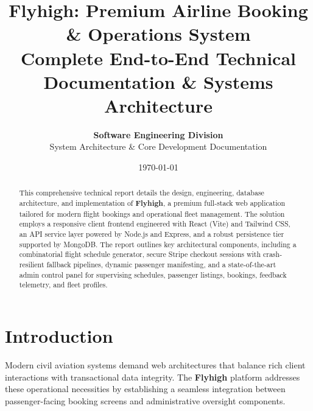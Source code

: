\documentclass[12pt,a4paper]{article}
\title{\textbf{Flyhigh: Premium Airline Booking \& Operations System} \\ \large Complete End-to-End Technical Documentation \& Systems Architecture}
\author{\textbf{Software Engineering Division} \\ System Architecture \& Core Development Documentation}
\date{\today}
\begin{document}
\maketitle

\begin{abstract}
This comprehensive technical report details the design, engineering, database architecture, and implementation of \textbf{Flyhigh}, a premium full-stack web application tailored for modern flight bookings and operational fleet management. The solution employs a responsive client frontend engineered with React (Vite) and Tailwind CSS, an API service layer powered by Node.js and Express, and a robust persistence tier supported by MongoDB. The report outlines key architectural components, including a combinatorial flight schedule generator, secure Stripe checkout sessions with crash-resilient fallback pipelines, dynamic passenger manifesting, and a state-of-the-art admin control panel for supervising schedules, passenger listings, bookings, feedback telemetry, and fleet profiles.
\end{abstract}

\newpage
\tableofcontents
\newpage

\section{Introduction}
Modern civil aviation systems demand web architectures that balance rich client interactions with transactional data integrity. The \textbf{Flyhigh} platform addresses these operational necessities by establishing a seamless integration between passenger-facing booking screens and administrative oversight components. 
\end{document}
